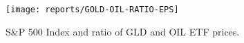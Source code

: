 \documentclass[a4paper,12pt]{article}
\begin{document}
\begin{figure}[!htb]
\centering
\texttt{[image: reports/GOLD-OIL-RATIO-EPS]}
\caption{S\&P 500 Index and ratio of GLD and OIL ETF prices.}
\label{fig:gold-oil-ratio}
\end{figure}
\end{document}
